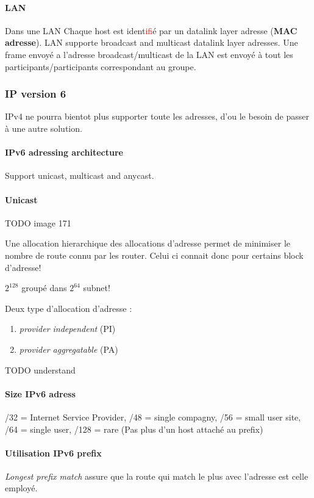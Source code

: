 \paragraph{LAN} Dans une LAN Chaque host est ident\textcolor{red}{if}ié par un datalink layer adresse
(\textbf{MAC adresse}).
LAN supporte broadcast and multicast datalink layer adresses. Une frame envoyé a l'adresse
broadcast/multicast de la LAN est envoyé à tout les participants/participants correspondant
au groupe.

\subsubsection{IP version 6}
IPv4 ne pourra bientot plus supporter toute les adresses, d'ou le besoin
de passer à une autre solution.

\paragraph{IPv6 adressing architecture}
Support unicast, multicast and anycast.

\paragraph{Unicast}
TODO image 171

Une allocation hierarchique des allocations d'adresse permet de minimiser
le nombre de route connu par les router. Celui ci connait donc pour
certains block d'adresse!

$2^{128}$ groupé dans $2^{64}$ subnet!


Deux type d'allocation d'adresse :
\begin{enumerate}
    \item \textit{provider independent} (PI)
    \item \textit{provider aggregatable} (PA)
\end{enumerate}
TODO understand

\paragraph{Size IPv6 adress}
/32 = Internet Service Provider, /48 = single compagny, /56 = small user site,
/64 = single user, /128 = rare (Pas plus d'un host attaché au prefix)

\paragraph{Utilisation IPv6 prefix}
\textit{Longest prefix match} assure que la route qui match le plus avec
l'adresse est celle employé.

